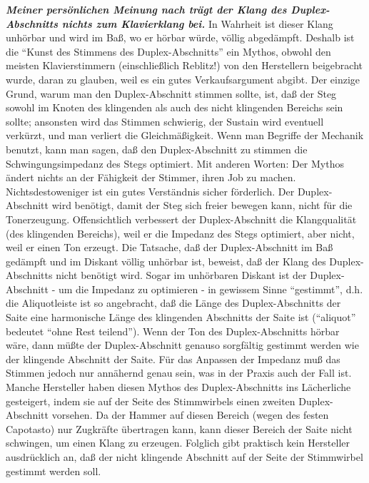 \textbf{\textit{Meiner persönlichen Meinung nach trägt der Klang des Duplex-Abschnitts nichts zum Klavierklang bei.}}
 In Wahrheit ist dieser Klang unhörbar und wird im Baß, wo er hörbar würde, völlig abgedämpft.
 Deshalb ist die \enquote{Kunst des Stimmens des Duplex-Abschnitts} ein Mythos, obwohl den meisten Klavierstimmern (einschließlich Reblitz!) von den Herstellern beigebracht wurde, daran zu glauben, weil es ein gutes Verkaufsargument abgibt.
 Der einzige Grund, warum man den Duplex-Abschnitt stimmen sollte, ist, daß der Steg sowohl im Knoten des klingenden als auch des nicht klingenden Bereichs sein sollte; ansonsten wird das Stimmen schwierig, der Sustain wird eventuell verkürzt, und man verliert die Gleichmäßigkeit.
 Wenn man Begriffe der Mechanik benutzt, kann man sagen, daß den Duplex-Abschnitt zu stimmen die Schwingungsimpedanz des Stegs optimiert.
 Mit anderen Worten: Der Mythos ändert nichts an der Fähigkeit der Stimmer, ihren Job zu machen.
 Nichtsdestoweniger ist ein gutes Verständnis sicher förderlich.
 Der Duplex-Abschnitt wird benötigt, damit der Steg sich freier bewegen kann, nicht für die Tonerzeugung.
 Offensichtlich verbessert der Duplex-Abschnitt die Klangqualität (des klingenden Bereichs), weil er die Impedanz des Stegs optimiert, aber nicht, weil er einen Ton erzeugt.
 Die Tatsache, daß der Duplex-Abschnitt im Baß gedämpft und im Diskant völlig unhörbar ist, beweist, daß der Klang des Duplex-Abschnitts nicht benötigt wird.
 Sogar im unhörbaren Diskant ist der Duplex-Abschnitt - um die Impedanz zu optimieren - in gewissem Sinne \enquote{gestimmt}, d.h. die Aliquotleiste ist so angebracht, daß die Länge des Duplex-Abschnitts der Saite eine harmonische Länge des klingenden Abschnitts der Saite ist (\enquote{aliquot} bedeutet \enquote{ohne Rest teilend}).
 Wenn der Ton des Duplex-Abschnitts hörbar wäre, dann müßte der Duplex-Abschnitt genauso sorgfältig gestimmt werden wie der klingende Abschnitt der Saite.
 Für das Anpassen der Impedanz muß das Stimmen jedoch nur annähernd genau sein, was in der Praxis auch der Fall ist.
 Manche Hersteller haben diesen Mythos des Duplex-Abschnitts ins Lächerliche gesteigert, indem sie auf der Seite des Stimmwirbels einen zweiten Duplex-Abschnitt vorsehen.
 Da der Hammer auf diesen Bereich (wegen des festen Capotasto) nur Zugkräfte übertragen kann, kann dieser Bereich der Saite nicht schwingen, um einen Klang zu erzeugen.
 Folglich gibt praktisch kein Hersteller ausdrücklich an, daß der nicht klingende Abschnitt auf der Seite der Stimmwirbel gestimmt werden soll.
 \hypertarget{c2_5h}{}\hypertarget{c2_5_disk}{}


